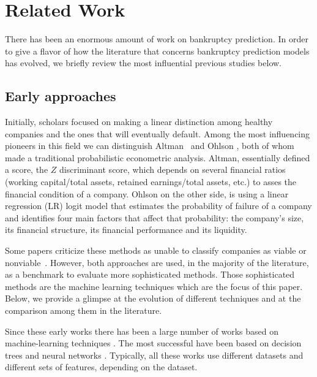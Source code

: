 
\section{Related Work}
\label{sec:related}

There has been an enormous amount of work on bankruptcy prediction. 
In order to give a flavor of how the literature that concerns bankruptcy prediction models has evolved, we briefly review the most influential previous studies below.


\subsection{Early approaches}

Initially, scholars focused on making a linear distinction among healthy
companies and the ones that will eventually default. Among the most
influencing pioneers in this field we can distinguish
Altman~\cite{Altman-8} and Ohlson \cite{Ohlson-9}, both of whom made a
traditional probabilistic econometric analysis. Altman, essentially
defined a score, the $Z$ discriminant score, which depends on several
financial ratios (working capital/total assets, retained earnings/total
assets, etc.) to asses the financial condition of a company.
Ohlson on the other side, is using a linear
regression (LR) logit model that estimates the probability of failure of
a company and identifies four main factors that affect that probability: the company’s size, its financial structure, its financial performance and its liquidity.

Some papers criticize these methods as unable to classify companies as viable or nonviable~\cite{Begley-10}. However, both
approaches are used, in the majority of the literature, as a benchmark
to evaluate more sophisticated methods.
Those sophisticated methods are the machine learning techniques which are the focus of this paper. Below, we provide a glimpse at the evolution of different techniques and at the comparison among them in the literature.

Since these early works there has been a large number of works based on machine-learning techniques \cite{lin-12, devi-18, nanni-09}.
The most successful have been based on 
decision trees \cite{Lee-10a, Zhou-10b, Gepp-10b, Martinelli-12} and neural networks
\cite{Fernandez-11, Odom-13, Boritz-14,Atiya-15,Wang-16}. Typically, all
these works use different datasets and different sets of features, depending on the dataset.

